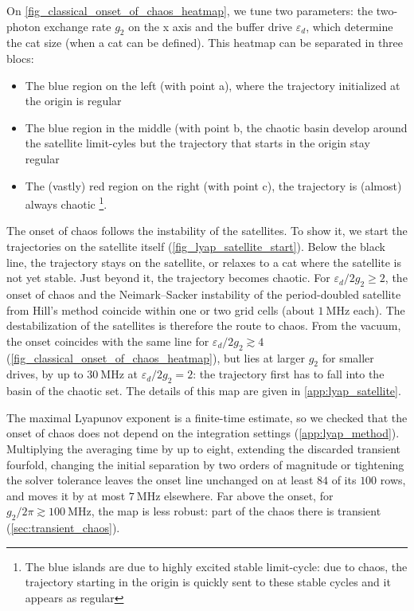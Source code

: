 \documentclass[aps,prx,reprint,floatfix,amsmath,amssymb,longbibliography]{revtex4-2}
\newcommand{\eps}{\varepsilon}
\begin{document}
On \cref{fig_classical_onset_of_chaos_heatmap}, we tune two parameters: the two-photon exchange rate $g_2$ on the x axis and the buffer drive $\eps_d$, which determine the cat size (when a cat can be defined). This heatmap can be separated in three blocs:
\begin{itemize}
    \item The blue region on the left (with point a), where the trajectory initialized at the origin is regular
    \item The blue region in the middle (with point b, the chaotic basin develop around the satellite limit-cyles but the trajectory that starts in the origin stay regular
    \item The (vastly) red region on the right (with point c), the trajectory is (almost) always chaotic \footnote{The blue islands are due to highly excited stable limit-cycle: due to chaos, the trajectory starting in the origin is quickly sent to these stable cycles and it appears as regular}.
\end{itemize}

The onset of chaos follows the instability of the satellites. To show it, we start the trajectories on the satellite itself (\cref{fig_lyap_satellite_start}). Below the black line, the trajectory stays on the satellite, or relaxes to a cat where the satellite is not yet stable. Just beyond it, the trajectory becomes chaotic. For $\eps_d/2g_2\ge2$, the onset of chaos and the Neimark--Sacker instability of the period-doubled satellite from Hill's method coincide within one or two grid cells (about $1~\mathrm{MHz}$ each). The destabilization of the satellites is therefore the route to chaos. From the vacuum, the onset coincides with the same line for $\eps_d/2g_2\gtrsim4$ (\cref{fig_classical_onset_of_chaos_heatmap}), but lies at larger $g_2$ for smaller drives, by up to $30~\mathrm{MHz}$ at $\eps_d/2g_2=2$: the trajectory first has to fall into the basin of the chaotic set. The details of this map are given in \cref{app:lyap_satellite}.

The maximal Lyapunov exponent is a finite-time estimate, so we checked that the onset of chaos does not depend on the integration settings (\cref{app:lyap_method}). Multiplying the averaging time by up to eight, extending the discarded transient fourfold, changing the initial separation by two orders of magnitude or tightening the solver tolerance leaves the onset line unchanged on at least $84$ of its $100$ rows, and moves it by at most $7~\mathrm{MHz}$ elsewhere. Far above the onset, for $g_2/2\pi\gtrsim100~\mathrm{MHz}$, the map is less robust: part of the chaos there is transient (\cref{sec:transient_chaos}).
\end{document}
